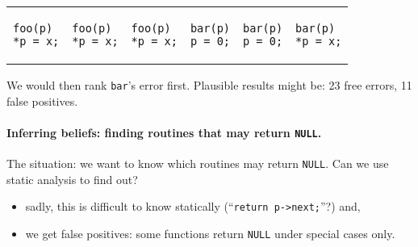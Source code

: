 \documentclass[11pt]{article}
\begin{document}
\begin{center}
\begin{tabular}{l|l|l|l|l|l}
\begin{minipage}{5em}
\begin{lstlisting}[numbers=none]
foo(p)
*p = x;
\end{lstlisting}
\end{minipage} &
\begin{minipage}{5em}
\begin{lstlisting}[numbers=none]
foo(p)
*p = x;
\end{lstlisting}
\end{minipage} &
\begin{minipage}{5em}
\begin{lstlisting}[numbers=none]
foo(p)
*p = x;
\end{lstlisting}
\end{minipage} &
\begin{minipage}{5em}
\begin{lstlisting}[numbers=none]
bar(p)
p = 0;
\end{lstlisting}
\end{minipage} &
\begin{minipage}{5em}
\begin{lstlisting}[numbers=none]
bar(p)
p = 0;
\end{lstlisting}
\end{minipage} &
\begin{minipage}{5em}
\begin{lstlisting}[numbers=none]
bar(p)
*p = x;
\end{lstlisting}
\end{minipage} 
\end{tabular}
\end{center}

We would then rank {\tt bar}'s error first.
Plausible results might be: 23 free errors, 11 false positives.


\paragraph{Inferring beliefs: finding routines that may return {\tt NULL}.}
The situation: we want to know which routines may return {\tt NULL}.
Can we use static analysis to find out?
\begin{itemize}[noitemsep]
      \item sadly, this is difficult to know statically (``{\tt return p->next;}''?) and,
      \item we get false positives: some functions return {\tt NULL} under special cases only.
\end{itemize}
\end{document}
